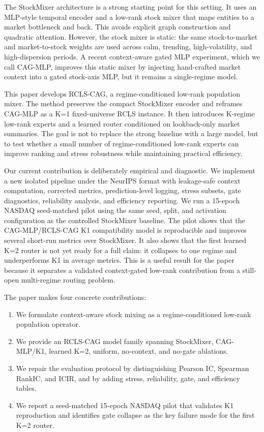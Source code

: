 \documentclass{article}
\begin{document}
The StockMixer architecture \citep{stockmixer} is a strong starting point for this setting. It uses an MLP-style temporal encoder and a low-rank stock mixer that maps entities to a market bottleneck and back. This avoids explicit graph construction and quadratic attention. However, the stock mixer is static: the same stock-to-market and market-to-stock weights are used across calm, trending, high-volatility, and high-dispersion periods. A recent context-aware gated MLP experiment, which we call CAG-MLP, improves this static mixer by injecting hand-crafted market context into a gated stock-axis MLP, but it remains a single-regime model.

This paper develops RCLS-CAG, a regime-conditioned low-rank population mixer. The method preserves the compact StockMixer encoder and reframes CAG-MLP as a K=1 fixed-universe RCLS instance. It then introduces K-regime low-rank experts and a learned router conditioned on lookback-only market summaries. The goal is not to replace the strong baseline with a large model, but to test whether a small number of regime-conditioned low-rank experts can improve ranking and stress robustness while maintaining practical efficiency.

Our current contribution is deliberately empirical and diagnostic. We implement a new isolated pipeline under the NeurIPS format with leakage-safe context computation, corrected metrics, prediction-level logging, stress subsets, gate diagnostics, reliability analysis, and efficiency reporting. We run a 15-epoch NASDAQ seed-matched pilot using the same seed, split, and activation configuration as the controlled StockMixer baseline. The pilot shows that the CAG-MLP/RCLS-CAG K1 compatibility model is reproducible and improves several short-run metrics over StockMixer. It also shows that the first learned K=2 router is not yet ready for a full claim: it collapses to one regime and underperforms K1 in average metrics. This is a useful result for the paper because it separates a validated context-gated low-rank contribution from a still-open multi-regime routing problem.

The paper makes four concrete contributions:
\begin{enumerate}
    \item We formulate context-aware stock mixing as a regime-conditioned low-rank population operator.
    \item We provide an RCLS-CAG model family spanning StockMixer, CAG-MLP/K1, learned K=2, uniform, no-context, and no-gate ablations.
    \item We repair the evaluation protocol by distinguishing Pearson IC, Spearman RankIC, and ICIR, and by adding stress, reliability, gate, and efficiency tables.
    \item We report a seed-matched 15-epoch NASDAQ pilot that validates K1 reproduction and identifies gate collapse as the key failure mode for the first K=2 router.
\end{enumerate}
\end{document}
